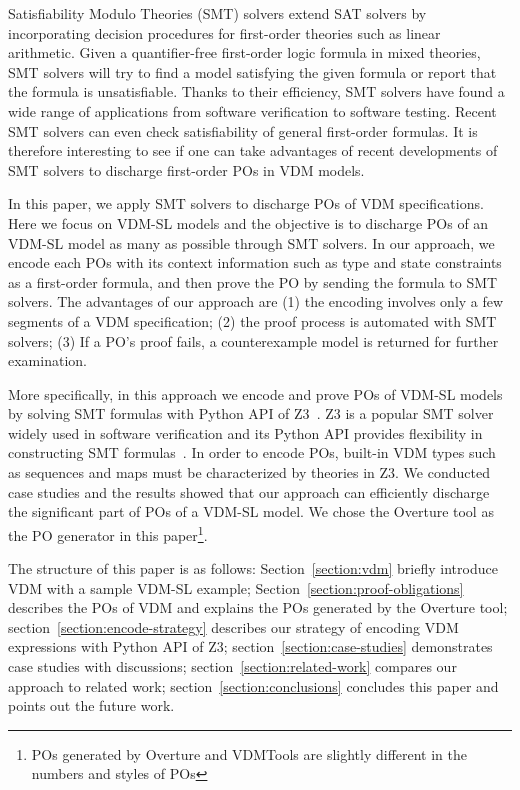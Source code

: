Satisfiability Modulo Theories (SMT) solvers extend SAT solvers by incorporating decision procedures for first-order theories such as linear arithmetic. Given a quantifier-free first-order logic formula in mixed theories, SMT solvers will try to find a model satisfying the given formula or report that the formula is unsatisfiable. Thanks to their efficiency, SMT solvers have found a wide range of applications from software verification to software testing. Recent SMT solvers can even check satisfiability of general first-order formulas. It is therefore interesting to see if one can take advantages of recent developments of SMT solvers to discharge first-order POs in VDM models. 


In this paper, we apply SMT solvers to discharge POs of VDM specifications. Here we focus on VDM-SL models and the objective is to discharge POs of an VDM-SL model as many as possible through SMT solvers. In our approach, we encode each POs with its context information such as type and state constraints as a first-order formula, and then prove the PO by sending the formula to SMT solvers. The advantages of our approach are (1) the encoding involves only a few segments of a VDM specification; (2) the proof process is automated with SMT solvers; (3) If a PO's proof fails, a counterexample model is returned for further examination. 

More specifically, in this approach we encode and prove POs of VDM-SL models by solving SMT formulas with Python API of Z3~\cite{MB:08:ZSS}. Z3 is a popular SMT solver widely used in software verification and its Python API provides flexibility in constructing SMT formulas~\cite{BarFT-SMTLIB}. In order to encode POs, built-in VDM types such as sequences and maps must be characterized by theories in Z3. We conducted case studies and the results showed that our approach can efficiently discharge the significant part of POs of a VDM-SL model. We chose the Overture tool as the PO generator in this paper\footnote{POs generated by Overture and VDMTools are slightly different in the numbers and styles of POs}.

The structure of this paper is as follows: Section~\ref{section:vdm} briefly introduce VDM with a sample VDM-SL example; Section~\ref{section:proof-obligations} describes the POs of VDM and explains the POs generated by the Overture tool; section~\ref{section:encode-strategy} describes our strategy of encoding VDM expressions with Python API of Z3; section~\ref{section:case-studies} demonstrates case studies with discussions; section~\ref{section:related-work} compares our approach to related work; section~\ref{section:conclusions} concludes this paper and points out the future work.

